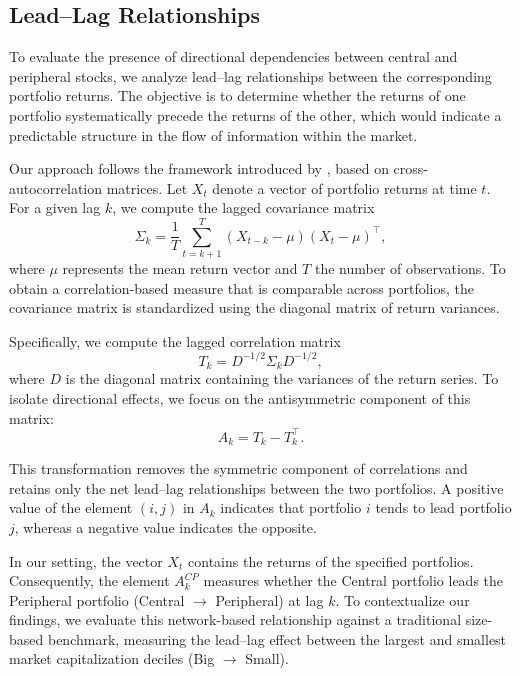 \documentclass[fleqn]{rbfin}
\begin{document}
\subsection{Lead--Lag Relationships}

\noindent To evaluate the presence of directional dependencies between central and peripheral stocks, we analyze lead--lag relationships between the corresponding portfolio returns. The objective is to determine whether the returns of one portfolio systematically precede the returns of the other, which would indicate a predictable structure in the flow of information within the market.

Our approach follows the framework introduced by \citet{lomackinlay1990}, based on cross-autocorrelation matrices. Let $X_t$ denote a vector of portfolio returns at time $t$. For a given lag $k$, we compute the lagged covariance matrix
\begin{equation}
\Sigma_k = \frac{1}{T} \sum_{t=k+1}^{T} (X_{t-k} - \mu)(X_t - \mu)^\top ,
\end{equation}
where $\mu$ represents the mean return vector and $T$ the number of observations. To obtain a correlation-based measure that is comparable across portfolios, the covariance matrix is standardized using the diagonal matrix of return variances. 

Specifically, we compute the lagged correlation matrix
\begin{equation}
T_k = D^{-1/2} \Sigma_k D^{-1/2},
\end{equation}
where $D$ is the diagonal matrix containing the variances of the return series. To isolate directional effects, we focus on the antisymmetric component of this matrix:
\begin{equation}
A_k = T_k - T_k^\intercal.
\end{equation}

This transformation removes the symmetric component of correlations and retains only the net lead--lag relationships between the two portfolios. A positive value of the element $(i,j)$ in $A_k$ indicates that portfolio $i$ tends to lead portfolio $j$, whereas a negative value indicates the opposite.

In our setting, the vector $X_t$ contains the returns of the specified portfolios. Consequently, the element $A_k^{CP}$ measures whether the Central portfolio leads the Peripheral portfolio (Central $\rightarrow$ Peripheral) at lag $k$. To contextualize our findings, we evaluate this network-based relationship against a traditional size-based benchmark, measuring the lead--lag effect between the largest and smallest market capitalization deciles (Big $\rightarrow$ Small). 
\end{document}
